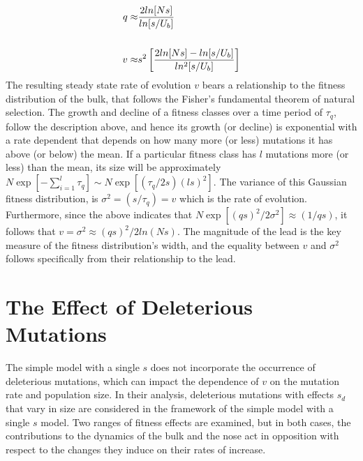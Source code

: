 \documentclass[12pt, one column]{article}
\begin{document}
\begin{equation}
\begin{aligned}
q \approx & {2ln[Ns] \over ln[s/U_b]} \\   
\\
v \approx & s^2 \left[{2ln[Ns] - ln[s/U_b] \over ln^2[s/U_b]}\right]
\end{aligned}
\end{equation} 
The resulting steady state rate of evolution $v$ bears a relationship to the fitness distribution of the bulk, that follows the Fisher's fundamental theorem of natural selection.  The growth and decline of a fitness classes over a time period of $\tau_q$, follow the description above, and hence its growth (or decline) is exponential with a rate dependent that depends on how many more (or less) mutations it has above (or below) the mean.  If a particular fitness class has $l$ mutations  more (or less) than the mean, its size will be approximately $N \exp[-\sum_{i=1}^{l} \tau_q] \sim N \exp[(\tau_q/2s)(ls)^2]$.  The variance of this Gaussian fitness distribution, is $\sigma^2 = (s/\tau_q)=v$ which is the rate of evolution.  Furthermore, since the above indicates that $N \exp[(qs)^2/2\sigma^2]\approx (1/qs)$, it follows that $v=\sigma^2 \approx (qs)^2/2ln(Ns)$.  The magnitude of the lead is the key measure of the fitness distribution's width, and the equality between $v$ and $\sigma^2$ follows specifically from their relationship to the lead.

\section*{The Effect of Deleterious Mutations}
The simple model with a single $s$ does not incorporate the occurrence of deleterious mutations, which can impact the dependence of $v$ on the mutation rate and population size.  In their analysis, deleterious mutations with effects $s_d$ that vary in size are considered in the framework of the simple model with a single $s$ model.  Two ranges of fitness effects are examined, but in both cases, the contributions to the dynamics of the bulk and the nose act in opposition with respect to the changes they induce on their rates of increase.   
\end{document}
